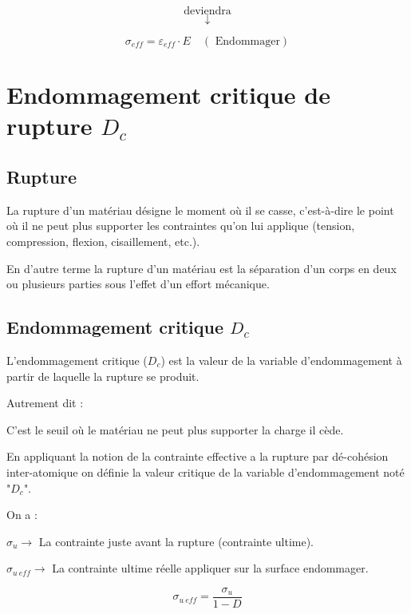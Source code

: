\documentclass[12pt,a4paper]{report}
\begin{document}
	\[ \text{deviendra} \]
	\[ \downarrow \]
	
	\[ \sigma_{eff} = \varepsilon_{eff} \cdot E \quad(\text{ Endommager}) \]
	\vspace{1cm}
	
	
	\section{Endommagement critique de rupture $D_{c}$}
	
	\subsection{Rupture}
	
	La rupture d’un matériau désigne le moment où il se casse, c’est-à-dire le point où il ne peut plus supporter les contraintes qu’on lui applique (tension, compression, flexion, cisaillement, etc.).
	
	\vspace{\baselineskip}
	
	En d'autre terme la rupture d’un matériau est la séparation d’un corps en deux ou plusieurs parties sous l’effet d’un effort mécanique.
	
	\subsection{Endommagement critique $D_{c}$}
	
	L’endommagement critique ($D_{c}$) est la valeur de la variable d’endommagement à partir de laquelle la rupture se produit.
	
	
	Autrement dit :
	
	
	C’est le seuil où le matériau ne peut plus supporter la charge il cède.
	
	\vspace{\baselineskip}
	
	En appliquant la notion de la contrainte effective  a la rupture par dé-cohésion inter-atomique on définie la valeur critique de la variable d'endommagement noté "$D_{c}$".
	
	\vspace{\baselineskip}
	
	On a :
	
	$\sigma_{u} \rightarrow$ La contrainte juste avant la rupture (contrainte ultime).
	
	$\sigma_{u \: eff} \rightarrow$ La contrainte ultime réelle appliquer sur la surface endommager.
	
	\[ \sigma_{u \: eff} = \dfrac{\sigma_{u}}{1 - D} \]
	
\end{document}
